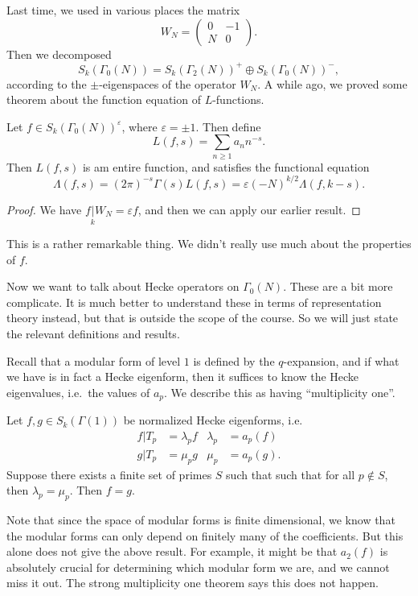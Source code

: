 \documentclass[a4paper]{article}
\begin{document}
Last time, we used in various places the matrix
\[
  W_N =
  \begin{pmatrix}
    0 & -1\\
    N & 0
  \end{pmatrix}.
\]
Then we decomposed
\[
  S_k(\Gamma_0(N)) = S_k(\Gamma_2(N))^+ \oplus S_k(\Gamma_0(N))^-,
\]
according to the $\pm$-eigenspaces of the operator $W_N$. A while ago, we proved some theorem about the function equation of $L$-functions.

\begin{thm}
  Let $f \in S_k(\Gamma_0(N))^{\varepsilon}$, where $\varepsilon = \pm 1$. Then define
  \[
    L(f, s) = \sum_{n\geq 1} a_n n^{-s}.
  \]
  Then $L(f, s)$ is am entire function, and satisfies the functional equation
  \[
    \Lambda(f, s) = (2\pi)^{-s} \Gamma(s) L(f, s) = \varepsilon (-N)^{k/2} \Lambda(f, k - s).
  \]
\end{thm}

\begin{proof}
  We have $f \underset{k}{|}W_N = \varepsilon f$, and then we can apply our earlier result. %
\end{proof}

This is a rather remarkable thing. We didn't really use much about the properties of $f$.

Now we want to talk about Hecke operators on $\Gamma_0(N)$. These are a bit more complicate. It is much better to understand these in terms of representation theory instead, but that is outside the scope of the course. So we will just state the relevant definitions and results.

Recall that a modular form of level $1$ is defined by the $q$-expansion, and if what we have is in fact a Hecke eigenform, then it suffices to know the Hecke eigenvalues, i.e.\ the values of $a_p$. We describe this as having ``multiplicity one''.
\begin{thm}
  Let $f, g \in S_k(\Gamma(1))$ be normalized Hecke eigenforms, i.e.
  \begin{align*}
    f | T_p &= \lambda_p f & \lambda_p &= a_p(f)\\
    g | T_p &= \mu_p g & \mu_p &= a_p(g).
  \end{align*}
  Suppose there exists a finite set of primes $S$ such that such that for all $p \not \in S$, then $\lambda_p = \mu_p$. Then $f = g$.
\end{thm}
Note that since the space of modular forms is finite dimensional, we know that the modular forms can only depend on finitely many of the coefficients. But this alone does not give the above result. For example, it might be that $a_2(f)$ is absolutely crucial for determining which modular form we are, and we cannot miss it out. The strong multiplicity one theorem says this does not happen.
\end{document}
